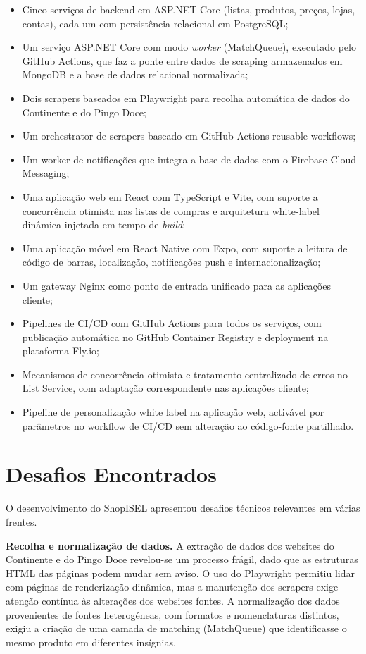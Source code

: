 \begin{itemize}
    \item Cinco serviços de backend em ASP.NET Core (listas, produtos, preços, lojas, contas), cada um com persistência relacional em PostgreSQL;
    \item Um serviço ASP.NET Core com modo \textit{worker} (MatchQueue), executado pelo GitHub Actions, que faz a ponte entre dados de scraping armazenados em MongoDB e a base de dados relacional normalizada;
    \item Dois scrapers baseados em Playwright para recolha automática de dados do Continente e do Pingo Doce;
    \item Um orchestrator de scrapers baseado em GitHub Actions reusable workflows;
    \item Um worker de notificações que integra a base de dados com o Firebase Cloud Messaging;
    \item Uma aplicação web em React com TypeScript e Vite, com suporte a concorrência otimista nas listas de compras e arquitetura white-label dinâmica injetada em tempo de \textit{build};
    \item Uma aplicação móvel em React Native com Expo, com suporte a leitura de código de barras, localização, notificações push e internacionalização;
    \item Um gateway Nginx como ponto de entrada unificado para as aplicações cliente;
    \item Pipelines de \ac{CI/CD} com GitHub Actions para todos os serviços, com publicação automática no GitHub Container Registry e deployment na plataforma Fly.io;
    \item Mecanismos de concorrência otimista e tratamento centralizado de erros no List Service, com adaptação correspondente nas aplicações cliente;
    \item Pipeline de personalização white label na aplicação web, activável por parâmetros no workflow de \ac{CI/CD} sem alteração ao código-fonte partilhado.
\end{itemize}

\section{Desafios Encontrados}
\label{sec:8.2}

O desenvolvimento do ShopISEL apresentou desafios técnicos relevantes em várias frentes.

\textbf{Recolha e normalização de dados.} A extração de dados dos websites do Continente e do Pingo Doce revelou-se um processo frágil, dado que as estruturas HTML das páginas podem mudar sem aviso. O uso do Playwright permitiu lidar com páginas de renderização dinâmica, mas a manutenção dos scrapers exige atenção contínua às alterações dos websites fontes. A normalização dos dados provenientes de fontes heterogéneas, com formatos e nomenclaturas distintos, exigiu a criação de uma camada de matching (MatchQueue) que identificasse o mesmo produto em diferentes insígnias.

